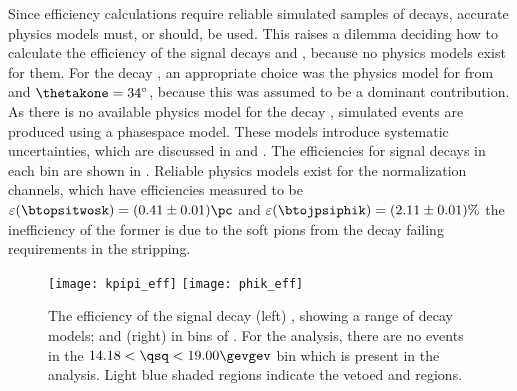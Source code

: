 Since efficiency calculations require reliable simulated samples of decays, accurate physics
models must, or should, be used.
This raises a dilemma deciding how to calculate the efficiency of the signal decays \btokpipimumu
and \btophikmumu, because no physics models exist for them.
For the decay \btokpipimumu, an appropriate choice
was the physics model for 
from  and $\thetakone=34^\circ$, because this was assumed to be a dominant
contribution.
As there is no available physics model for the decay \btophikmumu, simulated events are produced
using a phasespace model.
These models introduce systematic uncertainties, which are discussed in  and
.
The efficiencies for signal decays in each \qsq bin are shown in .
Reliable physics models exist for the normalization channels, which have efficiencies measured to
be $\varepsilon(\btopsitwosk)=(0.41\pm0.01)\pc$ and $\varepsilon(\btojpsiphik)=(2.11\pm0.01)\%$
the inefficiency of the former is due to the soft pions from the \psitwos decay failing \pt
requirements in the stripping.

\begin{figure}[t]
  \begin{center}
    \texttt{[image: kpipi\_eff]}
    \texttt{[image: phik\_eff]}
    \caption[Efficiency as a funciton of \qsq for \btokpipimumu and \btophikmumu]
    {
      The efficiency of the signal decay
      (left) \btokpipimumu, showing a range of decay models; and
      (right) \btophikmumu in bins of \qsq.
      For the \btophikmumu analysis, there are no events in the $14.18<\qsq<19.00\gevgev$ bin which
      is present in the \btokpipimumu analysis.
      Light blue shaded regions indicate the vetoed \jpsi and \psitwos regions.
    }
    \label{fig:hhh:effs}
  \end{center}
\end{figure}



